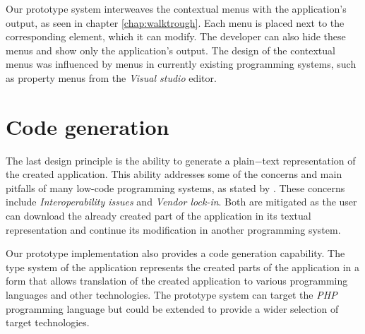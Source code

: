 Our prototype system interweaves the contextual menus with the application's output, as seen in chapter \ref{chap:walktrough}.
Each menu is placed next to the corresponding element, which it can modify.
The developer can also hide these menus and show only the application's output.
The design of the contextual menus was influenced by menus in currently existing programming systems, such as property menus from the \emph{Visual studio} editor.

\section{Code generation}

The last design principle is the ability to generate a plain−text representation of the created application.
This ability addresses some of the concerns and main pitfalls of many low-code programming systems, as stated by \citet{Pinho_Aguiar_Amaral_2023}.
These concerns include \emph{Interoperability issues} and \emph{Vendor lock-in}.
Both are mitigated as the user can download the already created part of the application in its textual representation and continue its modification in another programming system.

Our prototype implementation also provides a code generation capability.
The type system of the application represents the created parts of the application in a form that allows translation of the created application to various programming languages and other technologies.
The prototype system can target the \emph{PHP} programming language but could be extended to provide a wider selection of target technologies.













